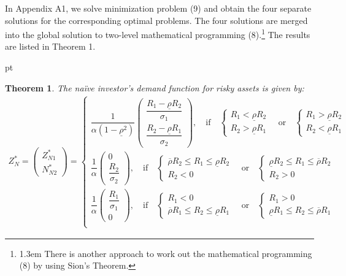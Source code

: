 \documentclass[10pt]{article}
\newtheorem{thm}{Theorem}
\begin{document}
In Appendix A1, we solve minimization problem (9) and obtain the four separate solutions for the corresponding optimal problems. The four solutions are merged into the global solution to two-level mathematical programming (8).\footnote{\baselineskip1.3em There is another approach to work out the mathematical programming (8) by using Sion's Theorem.} The results are listed in Theorem 1.

 pt

\begin{thm}
The na\"ive investor's demand function for risky assets is given by:
\begin{eqnarray}
Z_N^* = \left( \begin{matrix} Z_{N 1}^* \\ N_{N 2}^* \end{matrix} \right) = \left\{ \begin{matrix}
\dfrac1{\alpha (1 - \underline{\rho}^2)} \left( \begin{matrix} \dfrac{R_1 - \underline{\rho} R_2}{\sigma_1} \\ \dfrac{R_2 - \underline{\rho} R_1}{\sigma_2} \end{matrix} \right), \quad \text{if} \quad \left\{ \begin{matrix} R_1 < \underline{\rho} R_2 \\ R_2 > \underline{\rho} R_1 \end{matrix} \right. \quad \text{or} \quad \left\{ \begin{matrix} R_1 > \underline{\rho} R_2 \\ R_2 < \underline{\rho} R_1 \end{matrix} \right. \\
\dfrac1{\alpha} \left( \begin{matrix} 0 \\ \dfrac{R_2}{\sigma_2} \end{matrix} \right), \quad \text{if} \quad \left\{ \begin{matrix} \overline{\rho} R_2 \leqslant R_1 \leqslant \underline{\rho} R_2 \\ R_2 < 0 \end{matrix} \right. \quad \text{or} \quad \left\{ \begin{matrix} \underline{\rho} R_2 \leqslant R_1 \leqslant \overline{\rho} R_2 \\ R_2 > 0 \end{matrix} \right. \\
\dfrac1{\alpha} \left( \begin{matrix} \dfrac{R_1}{\sigma_1} \\ 0 \end{matrix} \right), \quad \text{if} \quad \left\{ \begin{matrix} R_1 < 0 \\ \overline{\rho} R_1 \leqslant R_2 \leqslant \underline{\rho} R_1 \end{matrix} \right. \quad \text{or} \quad \left\{ \begin{matrix} R_1 > 0 \\ \underline{\rho} R_1 \leqslant R_2 \leqslant \overline{\rho} R_1 \end{matrix} \right. \\

\end{matrix}
\end{eqnarray}
\end{thm}
\end{document}

